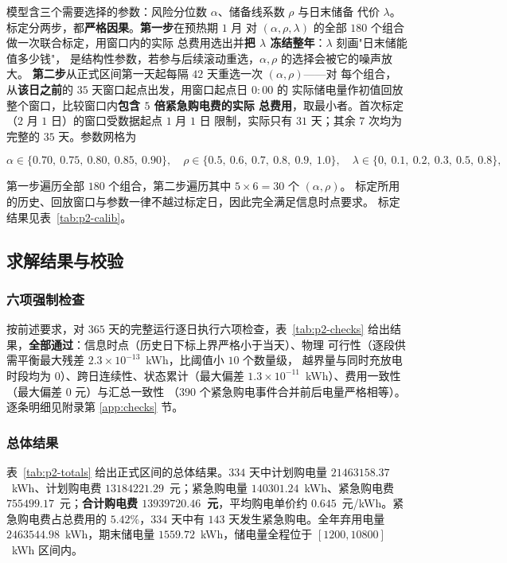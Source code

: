 \documentclass[withoutpreface,bwprint]{cumcmthesis}
\begin{document}
模型含三个需要选择的参数：风险分位数 $\alpha$、储备线系数 $\rho$ 与日末储备
代价 $\lambda$。标定分两步，都\textbf{严格因果}。\textbf{第一步}在预热期 $1$ 月
对 $(\alpha,\rho,\lambda)$ 的全部 $180$ 个组合做一次联合标定，用窗口内的实际
总费用选出并\textbf{把 $\lambda$ 冻结整年}：$\lambda$ 刻画"日末储能值多少钱"，
是结构性参数，若参与后续滚动重选，$\alpha,\rho$ 的选择会被它的噪声放大。
\textbf{第二步}从正式区间第一天起每隔 $42$ 天重选一次 $(\alpha,\rho)$——对
每个组合，从\textbf{该日之前}的 $35$ 天窗口起点出发，用窗口起点日 $0{:}00$ 的
实际储电量作初值回放整个窗口，比较窗口内\textbf{包含 $5$ 倍紧急购电费的实际
总费用}，取最小者。首次标定（$2$ 月 $1$ 日）的窗口受数据起点 $1$ 月 $1$ 日
限制，实际只有 $31$ 天；其余 $7$ 次均为完整的 $35$ 天。参数网格为

\begin{equation}
  \alpha\in\{0.70,\ 0.75,\ 0.80,\ 0.85,\ 0.90\},\quad
  \rho\in\{0.5,\ 0.6,\ 0.7,\ 0.8,\ 0.9,\ 1.0\},\quad
  \lambda\in\{0,\ 0.1,\ 0.2,\ 0.3,\ 0.5,\ 0.8\} ,
  \label{eq:p2-grid}
\end{equation}

第一步遍历全部 $180$ 个组合，第二步遍历其中 $5\times6=30$ 个 $(\alpha,\rho)$。
标定所用的历史、回放窗口与参数一律不越过标定日，因此完全满足信息时点要求。
标定结果见表~\ref{tab:p2-calib}。

\subsection{求解结果与校验}

\subsubsection{六项强制检查}

按前述要求，对 $365$ 天的完整运行逐日执行六项检查，表~\ref{tab:p2-checks}
给出结果，\textbf{全部通过}：信息时点（历史日下标上界严格小于当天）、物理
可行性（逐段供需平衡最大残差 $2.3\times10^{-13}$~kWh，比阈值小 $10$ 个数量级，
越界量与同时充放电时段均为 $0$）、跨日连续性、状态累计（最大偏差
$1.3\times10^{-11}$~kWh）、费用一致性（最大偏差 $0$ 元）与汇总一致性
（$390$ 个紧急购电事件合并前后电量严格相等）。逐条明细见附录第
\ref{app:checks} 节。
\subsubsection{总体结果}

表~\ref{tab:p2-totals} 给出正式区间的总体结果。$334$ 天中计划购电量
$21463158.37$~kWh、计划购电费 $13184221.29$~元；紧急购电量
$140301.24$~kWh、紧急购电费 $755499.17$~元；\textbf{合计购电费
$13939720.46$~元}，平均购电单价约 $0.645$~元/kWh。紧急购电费占总费用的
$5.42\%$，$334$ 天中有 $143$ 天发生紧急购电。全年弃用电量
$2463544.98$~kWh，期末储电量 $1559.72$~kWh，储电量全程位于
$[1200,10800]$~kWh 区间内。
\end{document}
